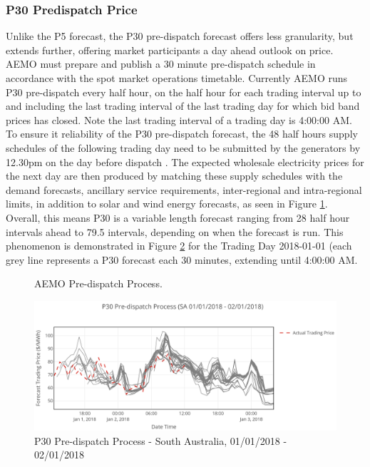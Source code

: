 \subsubsection{P30 Predispatch Price}
\label{sec:background_p30}
Unlike the P5 forecast, the P30 pre-dispatch forecast offers less granularity, but extends further, offering market participants a day ahead outlook on price. AEMO must prepare and publish a 30 minute pre-dispatch schedule in accordance with the spot market operations timetable. Currently AEMO runs P30 pre-dispatch every
half hour, on the half hour for each trading interval up to and including the last trading interval of the last trading day for which bid band prices has closed. Note the last trading interval of a trading day is 4:00:00 AM. To ensure it reliability of the P30 pre-dispatch forecast, the 48 half hours supply schedules of the following trading day need to be submitted by the generators by 12.30pm on the day before dispatch \parencite{Predispatch}. The expected wholesale electricity prices for the next day are then produced by matching these supply schedules with the demand forecasts, ancillary service requirements, inter-regional and intra-regional limits, in addition to solar and wind energy forecasts, as seen in Figure \ref{diagram:predispatch_process}. Overall, this means P30 is a variable length forecast ranging from 28 half hour intervals ahead to 79.5 intervals, depending on when the forecast is run. This phenomenon is demonstrated in Figure \ref{fig:p30_process_2} for the Trading Day 2018-01-01 (each grey line represents a P30 forecast each 30 minutes, extending until 4:00:00 AM.
\begin{figure}[h]
\centering

\caption{AEMO Pre-dispatch Process.}
\label{diagram:predispatch_process}
\end{figure}
\begin{figure}[]
\centering
\includegraphics[width=1\textwidth]{Pictures/Chapter2/P30_Process_2.png}
\caption{P30 Pre-dispatch Process - South Australia, 01/01/2018 - 02/01/2018}
\label{fig:p30_process_2}
\end{figure}
